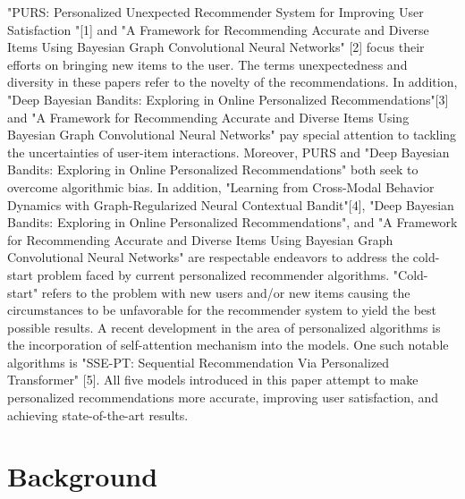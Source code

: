 "PURS: Personalized Unexpected Recommender System for Improving User Satisfaction "[1] and "A Framework for Recommending Accurate and Diverse Items Using Bayesian Graph Convolutional Neural Networks" [2] focus their efforts on bringing new items to the user. The terms unexpectedness and diversity in these papers refer to the novelty of the recommendations. In addition, "Deep Bayesian Bandits: Exploring in Online Personalized Recommendations"[3] and  "A Framework for Recommending Accurate and Diverse Items Using Bayesian Graph Convolutional Neural Networks" pay special attention to tackling the uncertainties of user-item interactions. Moreover,
PURS and "Deep Bayesian Bandits: Exploring in Online Personalized Recommendations" both seek to overcome algorithmic bias. In addition, "Learning from Cross-Modal Behavior Dynamics with Graph-Regularized Neural Contextual Bandit"[4], "Deep Bayesian Bandits: Exploring in Online Personalized Recommendations", and "A Framework for Recommending Accurate and Diverse Items Using Bayesian Graph Convolutional Neural Networks" are respectable endeavors to address the cold-start problem faced by current personalized recommender algorithms.  "Cold-start" refers to the problem with new users and/or new items causing the circumstances to be unfavorable for the recommender system to yield the best possible results.  A recent development in the area of personalized algorithms is the incorporation of self-attention mechanism into the models. One such notable algorithms is "SSE-PT:
Sequential Recommendation Via Personalized Transformer" [5]. All five models introduced in this paper attempt to make personalized recommendations more accurate, improving user satisfaction, and achieving state-of-the-art results. 
\chapter{Background}

